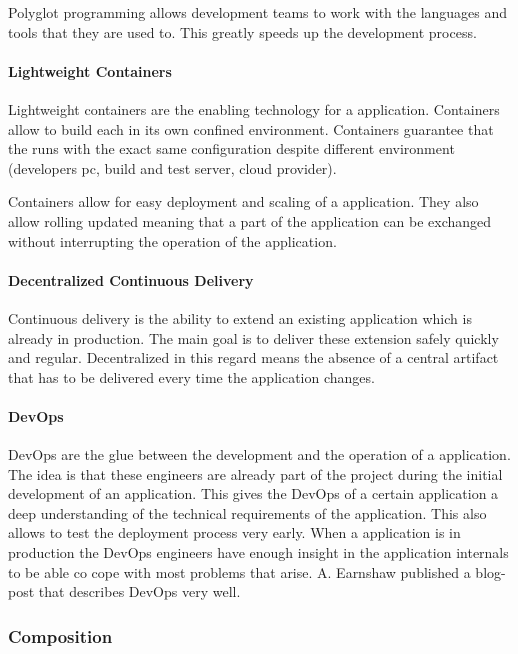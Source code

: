 Polyglot programming allows development teams to work with the languages and
tools that they are used to. This greatly speeds up the development process.

\paragraph{Lightweight Containers}

Lightweight containers are the enabling technology for a \ms{} application.
Containers allow to build each \ms{} in its own confined environment. Containers
guarantee that the \ms{} runs with the exact same configuration despite
different environment (developers pc, build and test server, cloud provider).

Containers allow for easy deployment and scaling of a \ms{} application. They
also allow rolling updated meaning that a part of the application can be
exchanged without interrupting the operation of the application.

\paragraph{Decentralized Continuous Delivery}

Continuous delivery is the ability to extend an existing \ms{} application which
is already in production. The main goal is to deliver these extension safely
quickly and regular. Decentralized in this regard means the absence of a central
artifact that has to be delivered every time the application changes.

\paragraph{DevOps}

DevOps are the glue between the development and the operation of a \ms{}
application. The idea is that these engineers are already part of the project
during the initial development of an application. This gives the DevOps of a
certain application a deep understanding of the technical requirements of the
application. This also allows to test the deployment process very early. When a
\ms{} application is in production the DevOps engineers have enough insight in
the application internals to be able co cope with most problems that arise.
A. Earnshaw published a blog-post that describes DevOps very
well\cite{earnshaw2013devops}.

\subsubsection{\ms{} Composition}
\label{subsub:composition}

